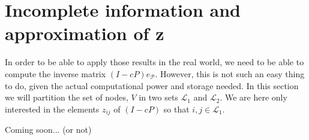 \documentclass{article}
\newcommand{\1}{\mathbf{1}}
\theoremstyle{definition}
\begin{document}
\section{Incomplete information and approximation of z}
In order to be able to apply those results in the real world, we need to be able to compute the inverse matrix \((I-cP)e_{\mathcal{P}}\). However, this is not such an easy thing to do, given the actual computational power and storage needed. In this section we will partition the set of nodes, \(V\) in two sets \(\mathcal{L}_1\) and \(\mathcal{L}_2\). We are here only interested in the elements \(z_{ij}\) of \((I-cP)\) so that \(i,j \in \mathcal{L}_1\).

Coming soon... (or not)



\end{document}
